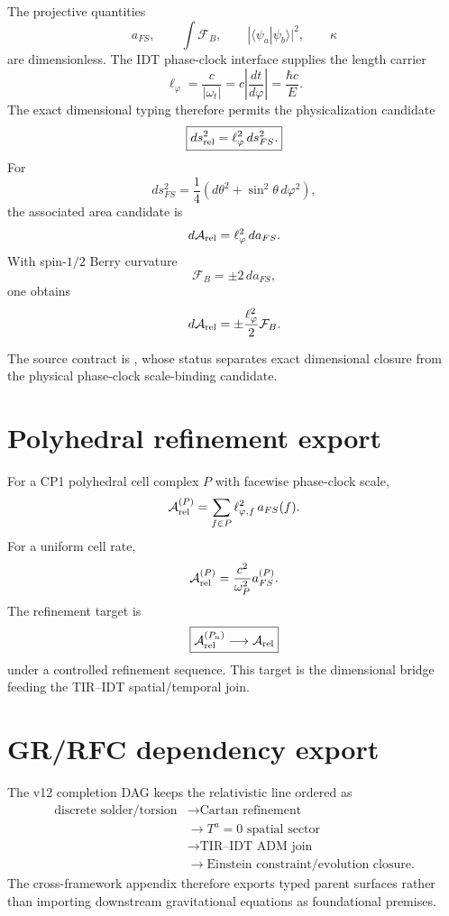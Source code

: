 The projective quantities
\[
a_{FS},\qquad
\int\mathcal F_B,\qquad
|\langle\psi_a|\psi_b\rangle|^2,\qquad
\kappa
\]
are dimensionless.  The IDT phase-clock interface supplies the length carrier
\[
\boxed{
\ell_\varphi
=\frac{c}{|\omega_t|}
=c\left|\frac{dt}{d\varphi}\right|
=\frac{\hbar c}{E}.
}
\]
The exact dimensional typing therefore permits the physicalization candidate
\[
\boxed{
ds_{\rm rel}^2
=\ell_\varphi^2\,ds_{FS}^2.
}
\]
For
\[
ds_{FS}^2
=\frac14(d\theta^2+\sin^2\theta\,d\varphi^2),
\]
the associated area candidate is
\[
d\mathcal A_{\rm rel}
=\ell_\varphi^2\,da_{FS}.
\]
With spin-\(1/2\) Berry curvature
\[
\mathcal F_B=\pm2\,da_{FS},
\]
one obtains
\[
d\mathcal A_{\rm rel}
=\pm\frac{\ell_\varphi^2}{2}\mathcal F_B.
\]

The source contract is
,
whose status separates exact dimensional closure from the physical
phase-clock scale-binding candidate.

\section{Polyhedral refinement export}

For a CP1 polyhedral cell complex \(P\) with facewise phase-clock scale,
\[
\mathcal A_{\rm rel}^{(P)}
=
\sum_{f\in P}\ell_{\varphi,f}^2\,a_{FS}(f).
\]
For a uniform cell rate,
\[
\mathcal A_{\rm rel}^{(P)}
=
\frac{c^2}{\omega_P^2}a_{FS}^{(P)}.
\]
The refinement target is
\[
\boxed{
\mathcal A_{\rm rel}^{(P_n)}
\longrightarrow
\mathcal A_{\rm rel}
}
\]
under a controlled refinement sequence.  This target is the dimensional bridge
feeding the TIR--IDT spatial/temporal join.

\section{GR/RFC dependency export}

The v12 completion DAG keeps the relativistic line ordered as
\[
\boxed{
\begin{aligned}
\text{discrete solder/torsion}
&\to\text{Cartan refinement}\\
&\to T^a=0\text{ spatial sector}\\
&\to\text{TIR--IDT ADM join}\\
&\to\text{Einstein constraint/evolution closure}.
\end{aligned}
}
\]
The cross-framework appendix therefore exports typed parent surfaces rather
than importing downstream gravitational equations as foundational premises.

